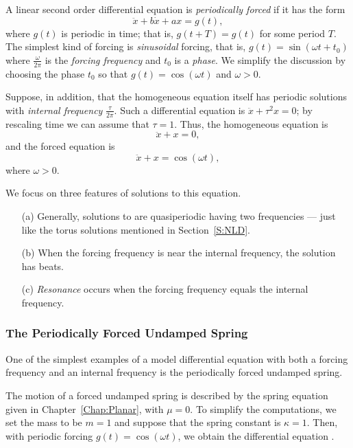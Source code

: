 \documentclass{ximera}
\begin{document}
A linear second order differential equation is {\em periodically forced\/} 
 if it has the form
\[
\ddot{x} + b\dot{x} + ax = g(t),
\]
where $g(t)$ is periodic in time; that is, $g(t+T) = g(t)$ for some
period $T$.  The simplest kind of forcing is {\em sinusoidal\/} forcing,
that is, $g(t)=\sin(\omega t+ t_0)$ where $\frac{\omega}{2\pi}$ is the 
{\em forcing frequency\/} and $t_0$ is a 
{\em phase\/}.  We simplify 
the discussion by choosing the phase $t_0$ so that $g(t)=\cos(\omega t)$ 
and $\omega>0$.

Suppose, in addition, that the homogeneous equation itself has periodic 
solutions with 
{\em internal frequency\/} 
$\frac{\tau}{2\pi}$.  Such a 
differential equation is $\ddot{x}+\tau^2x=0$; by rescaling time we 
can assume that $\tau=1$.   Thus, the homogeneous equation is 
\[
\ddot x + x = 0,
\]
and the forced equation is
\begin{equation} \label{eq:uspf}
\ddot x + x = \cos(\omega t),
\end{equation}
where $\omega>0$.

We focus on three features of solutions to this equation.
\begin{itemize}
\item[(a)]	Generally, solutions to  are quasiperiodic 
having two frequencies --- just like the torus 
solutions mentioned in Section~\ref{S:NLD}.
\item[(b)]	When the forcing frequency is near the internal frequency, the
solution has beats.
\item[(c)] 	{\em Resonance\/} occurs when the 
forcing frequency equals the internal frequency.  
\end{itemize}

\subsubsection*{The Periodically Forced Undamped Spring}

One of the simplest examples of a model differential equation with both a
forcing frequency and an internal frequency is the periodically forced 
 undamped spring.

The motion of a forced undamped spring is described by the spring equation 
given in Chapter~\ref{Chap:Planar},  with $\mu = 0$.
To simplify the computations, we set the mass to be $m=1$ and suppose that 
the spring constant is $\kappa=1$.  Then, with periodic forcing 
$g(t)=\cos(\omega t)$, we obtain the differential equation .
\end{document}
